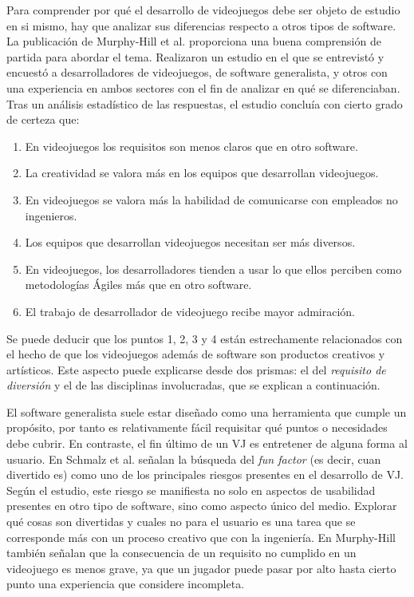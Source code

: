 Para comprender por qué el desarrollo de videojuegos debe ser objeto de estudio en si mismo, hay que analizar sus diferencias respecto a otros tipos de software. La publicación de Murphy-Hill et al.\cite{murphy-hill} proporciona una buena comprensión de partida para abordar el tema. Realizaron un estudio en el que se entrevistó y encuestó a desarrolladores de videojuegos, de software generalista, y otros con una experiencia en ambos sectores con el fin de analizar en qué se diferenciaban. Tras un análisis estadístico de las respuestas, el estudio concluía con cierto grado de certeza que:

\begin{enumerate}
    \item En videojuegos los requisitos son menos claros que en otro software.
    \item La creatividad se valora más en los equipos que desarrollan videojuegos.
    \item En videojuegos se valora más la habilidad de comunicarse con empleados no ingenieros.
    \item Los equipos que desarrollan videojuegos necesitan ser más diversos.
    \item En videojuegos, los desarrolladores tienden a usar lo que ellos perciben como metodologías Ágiles más que en otro software.
    \item El trabajo de desarrollador de videojuego recibe mayor admiración. 
\end{enumerate}

Se puede deducir que los puntos 1, 2, 3 y 4 están estrechamente relacionados con el hecho de que los videojuegos además de software son productos creativos y artísticos. Este aspecto puede explicarse desde dos prismas: el del \textit{requisito de diversión} y el de las disciplinas involucradas, que se explican a continuación.

El software generalista suele estar diseñado como una herramienta que cumple un propósito, por tanto es relativamente fácil requisitar qué puntos o necesidades debe cubrir. En contraste, el fin último de un VJ es entretener de alguna forma al usuario. En Schmalz et al.\cite{mark-schmalz} señalan la búsqueda del \textit{fun factor} (es decir, cuan divertido es) como uno de los principales riesgos presentes en el desarrollo de VJ. Según el estudio, este riesgo se manifiesta no solo en aspectos de usabilidad presentes en otro tipo de software, sino como aspecto único del medio. Explorar qué cosas son divertidas y cuales no para el usuario es una tarea que se corresponde más con un proceso creativo que con la ingeniería. En Murphy-Hill también señalan que la consecuencia de un requisito no cumplido en un videojuego es menos grave, ya que un jugador puede pasar por alto hasta cierto punto una experiencia que considere incompleta.

